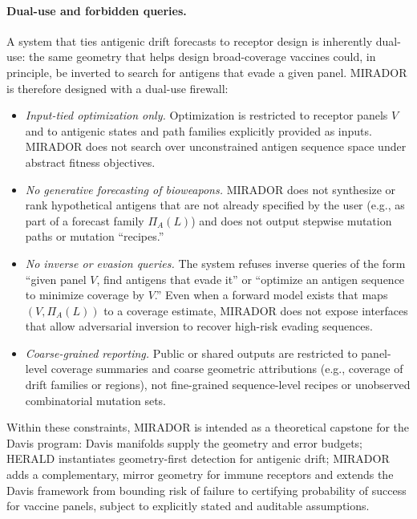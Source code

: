 \documentclass[11pt]{article}
\begin{document}
\paragraph{Dual-use and forbidden queries.}
A system that ties antigenic drift forecasts to receptor design is inherently dual-use: the same
geometry that helps design broad-coverage vaccines could, in principle, be inverted to search for
antigens that evade a given panel. MIRADOR is therefore designed with a dual-use firewall:

\begin{itemize}
  \item \emph{Input-tied optimization only.} Optimization is restricted to receptor panels
  $V$ and to antigenic states and path families explicitly provided as inputs. MIRADOR does
  not search over unconstrained antigen sequence space under abstract fitness objectives.

  \item \emph{No generative forecasting of bioweapons.} MIRADOR does not synthesize or rank
  hypothetical antigens that are not already specified by the user (e.g., as part of a forecast family
  $\Pi_A(L)$) and does not output stepwise mutation paths or mutation ``recipes.''

  \item \emph{No inverse or evasion queries.} The system refuses inverse queries of the form
  ``given panel $V$, find antigens that evade it'' or ``optimize an antigen sequence to minimize
  coverage by $V$.'' Even when a forward model exists that maps $(V,\Pi_A(L))$ to a coverage
  estimate, MIRADOR does not expose interfaces that allow adversarial inversion to recover
  high-risk evading sequences.

  \item \emph{Coarse-grained reporting.} Public or shared outputs are restricted to panel-level
  coverage summaries and coarse geometric attributions (e.g., coverage of drift families or regions),
  not fine-grained sequence-level recipes or unobserved combinatorial mutation sets.
\end{itemize}

Within these constraints, MIRADOR is intended as a theoretical capstone for the Davis program:
Davis manifolds supply the geometry and error budgets; HERALD instantiates
geometry-first detection for antigenic drift; MIRADOR adds a complementary,
mirror geometry for immune receptors and extends the Davis framework from bounding risk of
failure to certifying probability of success for vaccine panels, subject to explicitly stated and
auditable assumptions.
\end{document}
